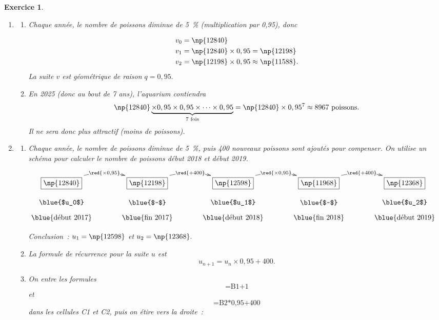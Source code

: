 \documentclass[10pt]{article}
\newtheorem{exo}{Exercice}
\begin{document}
\begin{exo}



\begin{enumerate}
\item \begin{enumerate}
\item Chaque année, le nombre de poissons diminue de 5~\% (multiplication par 0,95), donc

\begin{align*}
v_0&=\np{12840}\\
v_1&=\np{12840}\times 0,95=\np{12198}\\
v_2&=\np{12198}\times 0,95\approx\np{11588}.
\end{align*} La suite $v$ est géométrique de raison $q=0,95.$
\item En 2025 (donc au bout de 7 ans), l’aquarium contiendra
\[\np{12840}\underbrace{\times 0,95\times 0,95\times \cdots\times 0,95}_{\text{7 fois}}=\np{12840}\times 0,95^{7}\approx 8967~\text{poissons}.\] Il ne sera donc plus attractif (moins de  poissons).
\end{enumerate}
\item 
\begin{enumerate}
\item Chaque année, le nombre de poissons diminue de 5~\%, puis 400 nouveaux poissons sont ajoutés pour compenser. On utilise un schéma pour calculer le nombre de poissons début 2018 et début 2019.


\medskip

\scriptsize
\begin{center}
    $\xymatrix@R=0.5pc@C=3pc{
    *+[F]+{\np{12840}} \ar@/^0.5cm/[r]|{\red{\times 0,95}} & 
    *+[F]+{\np{12198}} \ar@/^0.5cm/[r]|{\red{+400}} & *+[F]+{\np{12598}}\ar@/^0.5cm/[r]|{\red{\times 0,95}} & *+[F]+{\np{11968}}\ar@/^0.5cm/[r]|{\red{+400}} & *+[F]+{\np{12368}} \\
    \txt{\blue{$u_0$}}&\txt{\blue{$~$}}&
    \txt{\blue{$u_1$}}&\txt{\blue{$~$}}&\txt{\blue{$u_2$}}\\
    \txt{\blue{début 2017}}&
    \txt{\blue{fin 2017}}&\txt{\blue{début 2018}}&
    \txt{\blue{fin 2018}}&\txt{\blue{début 2019}}
    }$
    \end{center}
\normalsize

\medskip

Conclusion~: $u_1=\np{12598}$ et  $u_2=\np{12368}.$
\item La formule de récurrence pour la suite $u$ est \[u_{n+1}=u_n\times 0,95+400.\]
\item On entre les formules \[\text{=B1+1}\] et \[\text{=B2*0,95+400}\] dans les cellules C1 et C2, puis on étire vers la droite~:


\end{enumerate}
\end{enumerate}
\end{exo}
\end{document}
